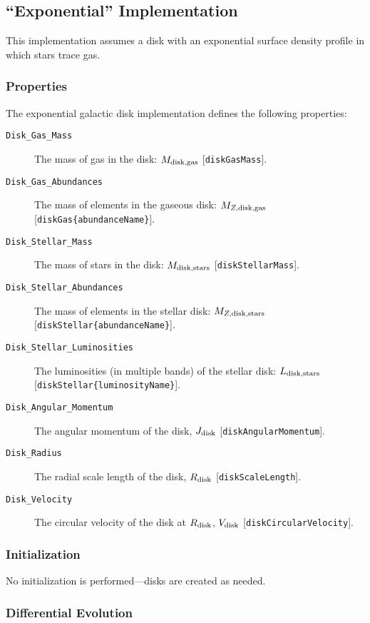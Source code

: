 \subsection{``Exponential'' Implementation}\label{sec:DiskExponential}

This implementation assumes a disk with an exponential surface density profile in which stars trace gas.

\subsubsection{Properties}

The exponential galactic disk implementation defines the following properties:
\begin{description}
 \item [{\tt Disk\_Gas\_Mass}] The mass of gas in the disk: $M_{\rm disk, gas}$ [{\tt diskGasMass}].
 \item [{\tt Disk\_Gas\_Abundances}] The mass of elements in the gaseous disk: $M_{Z, {\rm disk, gas}}$ [{\tt diskGas\{abundanceName\}}].
 \item [{\tt Disk\_Stellar\_Mass}] The mass of stars in the disk: $M_{\rm disk, stars}$ [{\tt diskStellarMass}].
 \item [{\tt Disk\_Stellar\_Abundances}] The mass of elements in the stellar disk: $M_{Z, {\rm disk, stars}}$ [{\tt diskStellar\{abundanceName\}}].
 \item [{\tt Disk\_Stellar\_Luminosities}] The luminosities (in multiple bands) of the stellar disk: $L_{\rm disk, stars}$ [{\tt diskStellar\{luminosityName\}}].
 \item [{\tt Disk\_Angular\_Momentum}] The angular momentum of the disk, $J_{\rm disk}$ [{\tt diskAngularMomentum}].
 \item [{\tt Disk\_Radius}] The radial scale length of the disk, $R_{\rm disk}$ [{\tt diskScaleLength}].
 \item [{\tt Disk\_Velocity}] The circular velocity of the disk at $R_{\rm disk}$, $V_{\rm disk}$ [{\tt diskCircularVelocity}].
\end{description}

\subsubsection{Initialization}

No initialization is performed---disks are created as needed.

\subsubsection{Differential Evolution}

